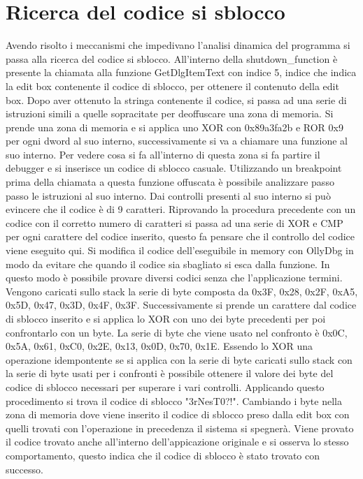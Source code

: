 \documentclass[a4paper,10pt]{article}
\begin{document}
\section{Ricerca del codice si sblocco}
Avendo risolto i meccanismi che impedivano l'analisi dinamica del programma si passa alla ricerca del codice si sblocco. All'interno della shutdown\_function è presente la chiamata alla funzione GetDlgItemText con indice 5, indice che indica la edit box contenente il codice di sblocco, per ottenere il contenuto della edit box. Dopo aver ottenuto la stringa  contenente il codice, si passa ad una serie di istruzioni simili a quelle sopracitate per deoffuscare una zona di memoria. Si prende una zona di memoria e si applica uno XOR con 0x89a3fa2b e ROR 0x9 per ogni dword al suo interno, successivamente si va a chiamare una funzione al suo interno. Per vedere cosa si fa all'interno di questa zona si fa partire il debugger e si inserisce un codice di sblocco casuale. Utilizzando un breakpoint prima della chiamata a questa funzione offuscata è possibile analizzare passo passo le istruzioni al suo interno. Dai controlli presenti al suo interno si può evincere che il codice è di 9 caratteri. Riprovando la procedura precedente con un codice con il corretto numero di caratteri si passa ad una serie di XOR e CMP per ogni carattere del codice inserito, questo fa pensare che il controllo del codice viene eseguito qui. Si modifica il codice dell'eseguibile in memory con OllyDbg in modo da evitare che quando il codice sia sbagliato si esca dalla funzione. In questo modo è possibile provare diversi codici senza che l'applicazione termini. Vengono caricati sullo stack la serie di byte composta da 0x3F, 0x28, 0x2F, 0xA5, 0x5D, 0x47, 0x3D, 0x4F, 0x3F. Successivamente si prende un carattere dal codice di sblocco inserito e si applica lo XOR con uno dei byte precedenti per poi confrontarlo con un byte. La serie di byte che viene usato nel confronto è 0x0C, 0x5A, 0x61, 0xC0, 0x2E, 0x13, 0x0D, 0x70, 0x1E. Essendo lo XOR una operazione idempontente se si applica con la serie di byte caricati sullo stack con la serie di byte usati per i confronti è possibile ottenere il valore dei byte del codice di sblocco necessari per superare i vari controlli. Applicando questo procedimento si trova il codice di sblocco "3rNesT0?!". Cambiando i byte nella zona di memoria dove viene inserito il codice di sblocco preso dalla edit box con quelli trovati con l'operazione in precedenza il sistema si spegnerà. Viene provato il codice trovato anche all'interno dell'appicazione originale e si osserva lo stesso comportamento, questo indica che il codice di sblocco è stato trovato con successo. 
\end{document}
